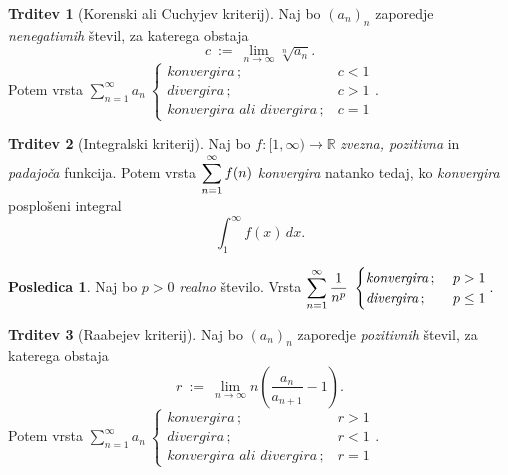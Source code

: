 \documentclass[11pt]{article}
\newcommand{\R}{\mathbb{R}}
\theoremstyle{definition}
\theoremstyle{definition}
\newtheorem{trditev}{Trditev}[section]
\theoremstyle{definition}
\theoremstyle{theorem}
\newtheorem*{posledica}{Posledica}
\begin{document}
\begin{trditev}[Korenski ali Cuchyjev kriterij]

Naj bo $(a_n)_n$ zaporedje \\\hbox{\textit{nenegativnih}} števil, za katerega obstaja
$$c ~:=~ \lim_{n \rightarrow \infty} \sqrt[n]{a_n}.$$
Potem vrsta $\sum_{n=1}^\infty a_n ~ \begin{cases}
\textit{konvergira}\,; ~&c<1\\
\textit{divergira}\,; ~&c>1 \\
\textit{konvergira ali divergira}\,; ~&c=1
\end{cases}.$ 

\end{trditev}
\vspace{0.5cm}

\begin{trditev}[Integralski kriterij]

Naj bo $f: [1, \infty) \rightarrow \R$ \textit{zvezna, pozitivna} in \textit{padajoča} funkcija. Potem vrsta $\mathlarger{\sum_{n=1}^\infty f(n)}$ \textit{konvergira} natanko tedaj, ko \textit{konvergira} posplošeni integral
$$\int_1^\infty f(x)\,dx.$$

\end{trditev}
\vspace{0.5cm}

\begin{posledica}

Naj bo $p>0$ \textit{realno} število. Vrsta $\mathlarger{\sum_{n=1}^\infty \frac{1}{n^p}} ~ \begin{cases}
\textit{konvergira}\,; ~&p>1 \\
\textit{divergira}\,; ~&p \leq 1
\end{cases}.$

\end{posledica}
\vspace{0.5cm}

\begin{trditev}[Raabejev kriterij]

Naj bo $(a_n)_n$ zaporedje \textit{pozitivnih} števil, za katerega obstaja
$$r ~:=~ \lim_{n \rightarrow \infty} n \left( \frac{a_n}{a_{n+1}} - 1 \right).$$
Potem vrsta $\sum_{n=1}^\infty a_n ~ \begin{cases}
\textit{konvergira}\,; ~&r>1 \\
\textit{divergira}\,; ~&r<1 \\
\textit{konvergira ali divergira}\,; ~&r=1
\end{cases}.$

\end{trditev}
\vspace{0.5cm}
\end{document}

